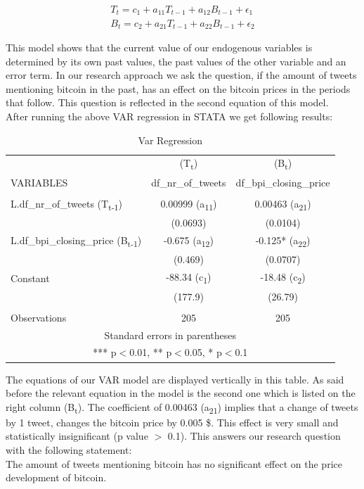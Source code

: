 \documentclass[a4paper,american,12pt]{article}
\begin{document}
\begin{spacing}{1.2}
\begin{equation}
\begin{split}
T_t = c_1 + a_{11}T_{t-1} + a_{12}B_{t-1} + \epsilon_1 \\
B_t = c_2 + a_{21}T_{t-1} + a_{22}B_{t-1} + \epsilon_2
\end{split}
\end{equation}

This model shows that the current value of our endogenous variables is determined by its own past values, the past values of the other variable and an error term. In our research approach we ask the question, if the amount of tweets mentioning bitcoin in the past, has an effect on the bitcoin prices in the periods that follow. This question is reflected in the second equation of this model.\\

After running the above VAR regression in STATA we get following results:
	
\begin{table}
\centering
	\begin{tabular}{lcc} \hline
	 & (T\textsubscript{t}) & (B\textsubscript{t}) \\
	VARIABLES & df\_nr\_of\_tweets & df\_bpi\_closing\_price \\ \hline
	 &  &  \\
	L.df\_nr\_of\_tweets (T\textsubscript{t-1}) & 0.00999 (a\textsubscript{11}) & 0.00463 (a\textsubscript{21}) \\
	 & (0.0693) & (0.0104) \\
	L.df\_bpi\_closing\_price (B\textsubscript{t-1}) & -0.675 (a\textsubscript{12}) & -0.125* (a\textsubscript{22}) \\
	 & (0.469) & (0.0707) \\
	Constant  & -88.34 (c\textsubscript{1}) & -18.48 (c\textsubscript{2}) \\
	 & (177.9) & (26.79) \\
	 &  &  \\
	 Observations & 205 & 205 \\ \hline
	\multicolumn{3}{c}{ Standard errors in parentheses} \\
	\multicolumn{3}{c}{ *** p$<$0.01, ** p$<$0.05, * p$<$0.1} \\
	\end{tabular}
\caption{Var Regression}
\end{table}

The equations of our VAR model are displayed vertically in this table. As said before the relevant equation in the model is the second one which is listed on the right column (B\textsubscript{t}). The coefficient of 0.00463 (a\textsubscript{21}) implies that a change of tweets by 1 tweet, changes the bitcoin price by 0.005 \$. This effect is very small and statistically insignificant (p value $>$ 0.1). This answers our research question with the following statement:\\ The amount of tweets mentioning bitcoin has no significant effect on the price development of bitcoin.
		

\end{spacing}
\end{document}

